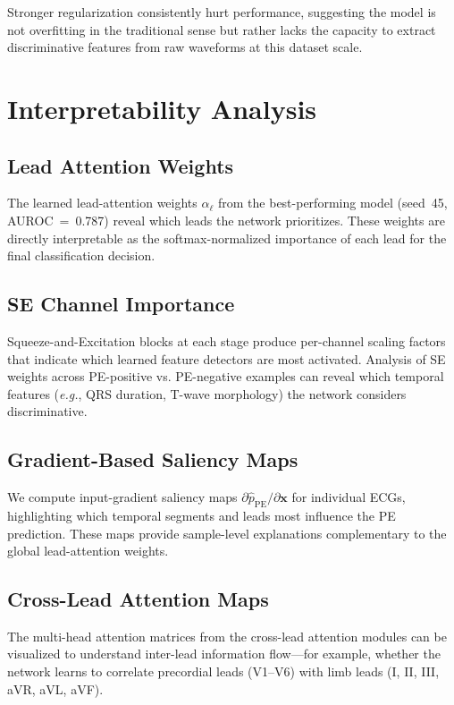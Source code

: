 \documentclass[11pt,a4paper]{article}
\newcommand{\eg}{\textit{e.g.}}
\begin{document}
Stronger regularization consistently hurt performance, suggesting the model is not overfitting in the traditional sense but rather lacks the capacity to extract discriminative features from raw waveforms at this dataset scale.


\section{Interpretability Analysis}
\label{sec:interpretability}

\subsection{Lead Attention Weights}

The learned lead-attention weights $\alpha_\ell$ from the best-performing model (seed~45, AUROC~=~0.787) reveal which leads the network prioritizes. These weights are directly interpretable as the softmax-normalized importance of each lead for the final classification decision.

\subsection{SE Channel Importance}

Squeeze-and-Excitation blocks at each stage produce per-channel scaling factors that indicate which learned feature detectors are most activated. Analysis of SE weights across PE-positive vs. PE-negative examples can reveal which temporal features (\eg, QRS duration, T-wave morphology) the network considers discriminative.

\subsection{Gradient-Based Saliency Maps}

We compute input-gradient saliency maps $\partial \hat{p}_{\text{PE}} / \partial \mathbf{x}$ for individual ECGs, highlighting which temporal segments and leads most influence the PE prediction. These maps provide sample-level explanations complementary to the global lead-attention weights.

\subsection{Cross-Lead Attention Maps}

The multi-head attention matrices from the cross-lead attention modules can be visualized to understand inter-lead information flow---for example, whether the network learns to correlate precordial leads (V1--V6) with limb leads (I, II, III, aVR, aVL, aVF).
\end{document}

